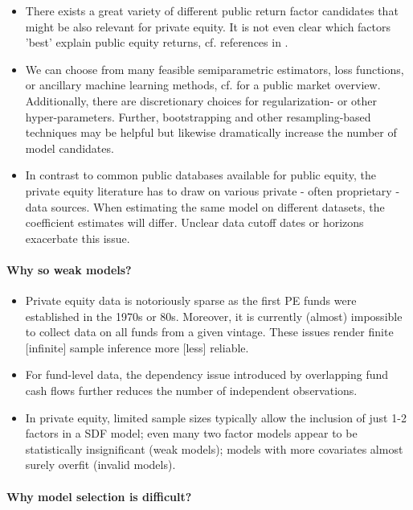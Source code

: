 \documentclass[12pt]{article}
\begin{document}
\begin{itemize}
	\item There exists a great variety of different public return factor candidates that might be also relevant for private equity. It is not even clear which factors 'best' explain public equity returns, cf. references in \cite{KN20}. 
	\item We can choose from many feasible semiparametric estimators, loss functions, or ancillary machine learning methods, cf. \cite{GKX20} for a public market overview.
	Additionally, there are discretionary choices for regularization- or other hyper-parameters.
	Further, bootstrapping and other resampling-based techniques may be helpful but likewise dramatically increase the number of model candidates.
	\item In contrast to common public databases available for public equity, the private equity literature has to draw on various private - often proprietary - data sources. When estimating the same model on different datasets, the coefficient estimates will differ. Unclear data cutoff dates or horizons exacerbate this issue.
\end{itemize}

\paragraph{Why so weak models?}

\begin{itemize}
	\item Private equity data is notoriously sparse as the first PE funds were established in the 1970s or 80s. Moreover, it is currently (almost) impossible to collect data on all funds from a given vintage. These issues render finite [infinite] sample inference more [less] reliable.
	\item For fund-level data, the dependency issue introduced by overlapping fund cash flows further reduces the number of independent observations.
	\item In private equity, limited sample sizes typically allow the inclusion of just 1-2 factors in a SDF model; even many two factor models appear to be statistically insignificant (weak models); models with more covariates almost surely overfit (invalid models).
\end{itemize}

\paragraph{Why model selection is difficult?}
\end{document}
